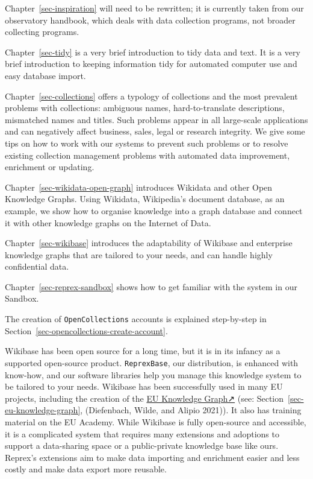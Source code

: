 \documentclass[
  letterpaper,
  DIV=11,
  numbers=noendperiod]{scrreprt}
\begin{document}
Chapter~\ref{sec-inspiration} will need to be rewritten; it is currently
taken from our observatory handbook, which deals with data collection
programs, not broader collecting programs.

Chapter~\ref{sec-tidy} is a very brief introduction to tidy data and
text. It is a very brief introduction to keeping information tidy for
automated computer use and easy database import.

Chapter~\ref{sec-collections} offers a typology of collections and the
most prevalent problems with collections: ambiguous names,
hard-to-translate descriptions, mismatched names and titles. Such
problems appear in all large-scale applications and can negatively
affect business, sales, legal or research integrity. We give some tips
on how to work with our systems to prevent such problems or to resolve
existing collection management problems with automated data improvement,
enrichment or updating.

Chapter~\ref{sec-wikidata-open-graph} introduces Wikidata and other Open
Knowledge Graphs. Using Wikidata, Wikipedia's document database, as an
example, we show how to organise knowledge into a graph database and
connect it with other knowledge graphs on the Internet of Data.

Chapter~\ref{sec-wikibase} introduces the adaptability of Wikibase and
enterprise knowledge graphs that are tailored to your needs, and can
handle highly confidential data.

Chapter~\ref{sec-reprex-sandbox} shows how to get familiar with the
system in our Sandbox.

The creation of \texttt{OpenCollections} accounts is explained
step-by-step in Section~\ref{sec-opencollections-create-account}.

Wikibase has been open source for a long time, but it is in its infancy
as a supported open-source product. \texttt{ReprexBase}, our
distribution, is enhanced with know-how, and our software libraries help
you manage this knowledge system to be tailored to your needs. Wikibase
has been successfully used in many EU projects, including the creation
of the \href{https://linkedopendata.eu/wiki/The_EU_Knowledge_Graph}{EU
Knowledge Graph↗} (see: Section~\ref{sec-eu-knowledge-graph},
(Diefenbach, Wilde, and Alipio 2021)). It also has training material on
the EU Academy. While Wikibase is fully open-source and accessible, it
is a complicated system that requires many extensions and adoptions to
support a data-sharing space or a public-private knowledge base like
ours. Reprex's extensions aim to make data importing and enrichment
easier and less costly and make data export more reusable.
\end{document}
